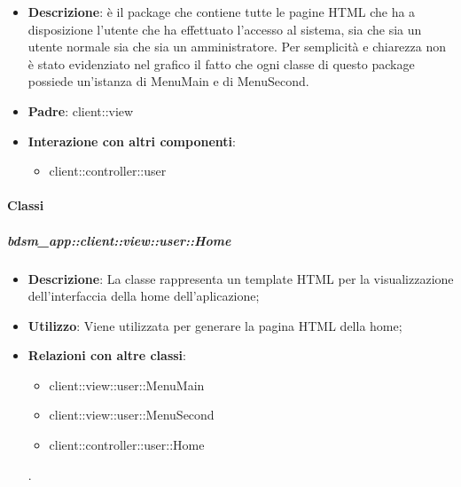 \begin{itemize}
	\item \textbf{Descrizione}: è il package che contiene tutte le pagine HTML che ha a disposizione l'utente che ha effettuato l'accesso al sistema, sia che sia un utente normale sia che sia un amministratore. \newline
	Per semplicità e chiarezza non è stato evidenziato nel grafico il fatto che ogni classe di questo package possiede un'istanza di MenuMain e di MenuSecond.
	\item \textbf{Padre}: client::view
	\item \textbf{Interazione con altri componenti}:
		\begin{itemize}
			\item client::controller::user
		\end{itemize}
\end{itemize}

	\paragraph{Classi} %
		\subparagraph{bdsm\_app::client::view::user::Home} %
		\label{subp:bdsm_app_client_view_user_home}
			\begin{itemize}
				\item \textbf{Descrizione}: La classe rappresenta un template HTML per la visualizzazione dell'interfaccia della home dell'aplicazione;
				\item \textbf{Utilizzo}: Viene utilizzata per generare la pagina HTML della home;
				\item \textbf{Relazioni con altre classi}: 		
					\begin{itemize}
						\item client::view::user::MenuMain
						\item client::view::user::MenuSecond
						\item client::controller::user::Home
					\end{itemize}.
			\end{itemize}

